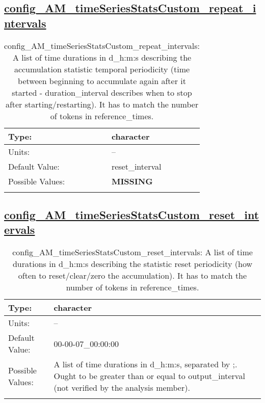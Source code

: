 \subsection[config\_AM\_timeSeriesStatsCustom\_repeat\_intervals]{\hyperref[sec:nm_tab_AM_timeSeriesStatsCustom]{config\_AM\_timeSeriesStatsCustom\_repeat\_intervals}}
\label{subsec:nm_sec_config_AM_timeSeriesStatsCustom_repeat_intervals}
\begin{center}
\begin{longtable}{| p{2.0in} || p{4.0in} |}
    \hline
    Type: & character \\
    \hline
    Units: & -- \\
    \hline
    Default Value: & reset\_interval \\
    \hline
    Possible Values: & {\bf \color{red} MISSING} \\
    \hline
    \caption{config\_AM\_timeSeriesStatsCustom\_repeat\_intervals: A list of time durations in d\_h:m:s describing the accumulation statistic temporal periodicity (time between beginning to accumulate again after it started - duration\_interval describes when to stop after starting/restarting). It has to match the number of tokens in reference\_times.}
\end{longtable}
\end{center}
\subsection[config\_AM\_timeSeriesStatsCustom\_reset\_intervals]{\hyperref[sec:nm_tab_AM_timeSeriesStatsCustom]{config\_AM\_timeSeriesStatsCustom\_reset\_intervals}}
\label{subsec:nm_sec_config_AM_timeSeriesStatsCustom_reset_intervals}
\begin{center}
\begin{longtable}{| p{2.0in} || p{4.0in} |}
    \hline
    Type: & character \\
    \hline
    Units: & -- \\
    \hline
    Default Value: & 00-00-07\_00:00:00 \\
    \hline
    Possible Values: & A list of time durations in d\_h:m:s, separated by ;. Ought to be greater than or equal to output\_interval (not verified by the analysis member). \\
    \hline
    \caption{config\_AM\_timeSeriesStatsCustom\_reset\_intervals: A list of time durations in d\_h:m:s describing the statistic reset periodicity (how often to reset/clear/zero the accumulation). It has to match the number of tokens in reference\_times.}
\end{longtable}
\end{center}
